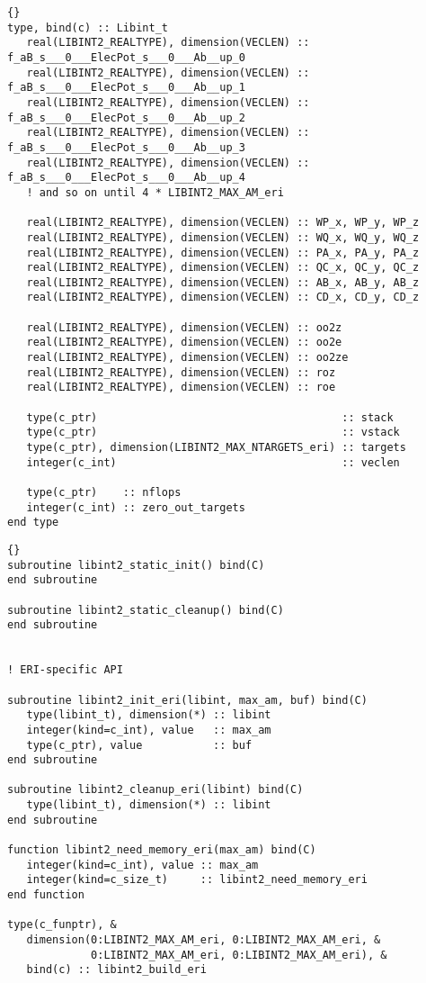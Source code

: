 \documentclass[10pt]{article}
\begin{document}
\begin{lstlisting}[label=lst:libinttf,caption=Fortran definition of the \LIBINT\ integral evaluator type.]{}
type, bind(c) :: Libint_t
   real(LIBINT2_REALTYPE), dimension(VECLEN) :: f_aB_s___0___ElecPot_s___0___Ab__up_0
   real(LIBINT2_REALTYPE), dimension(VECLEN) :: f_aB_s___0___ElecPot_s___0___Ab__up_1
   real(LIBINT2_REALTYPE), dimension(VECLEN) :: f_aB_s___0___ElecPot_s___0___Ab__up_2
   real(LIBINT2_REALTYPE), dimension(VECLEN) :: f_aB_s___0___ElecPot_s___0___Ab__up_3
   real(LIBINT2_REALTYPE), dimension(VECLEN) :: f_aB_s___0___ElecPot_s___0___Ab__up_4
   ! and so on until 4 * LIBINT2_MAX_AM_eri

   real(LIBINT2_REALTYPE), dimension(VECLEN) :: WP_x, WP_y, WP_z
   real(LIBINT2_REALTYPE), dimension(VECLEN) :: WQ_x, WQ_y, WQ_z
   real(LIBINT2_REALTYPE), dimension(VECLEN) :: PA_x, PA_y, PA_z
   real(LIBINT2_REALTYPE), dimension(VECLEN) :: QC_x, QC_y, QC_z
   real(LIBINT2_REALTYPE), dimension(VECLEN) :: AB_x, AB_y, AB_z
   real(LIBINT2_REALTYPE), dimension(VECLEN) :: CD_x, CD_y, CD_z

   real(LIBINT2_REALTYPE), dimension(VECLEN) :: oo2z
   real(LIBINT2_REALTYPE), dimension(VECLEN) :: oo2e
   real(LIBINT2_REALTYPE), dimension(VECLEN) :: oo2ze
   real(LIBINT2_REALTYPE), dimension(VECLEN) :: roz
   real(LIBINT2_REALTYPE), dimension(VECLEN) :: roe

   type(c_ptr)                                      :: stack
   type(c_ptr)                                      :: vstack
   type(c_ptr), dimension(LIBINT2_MAX_NTARGETS_eri) :: targets
   integer(c_int)                                   :: veclen

   type(c_ptr)    :: nflops
   integer(c_int) :: zero_out_targets
end type
\end{lstlisting}

\begin{lstlisting}[label=lst:apif,caption=\LIBINT\ Fortran API procedures and data.]{}
subroutine libint2_static_init() bind(C)
end subroutine

subroutine libint2_static_cleanup() bind(C)
end subroutine


! ERI-specific API

subroutine libint2_init_eri(libint, max_am, buf) bind(C)
   type(libint_t), dimension(*) :: libint
   integer(kind=c_int), value   :: max_am
   type(c_ptr), value           :: buf
end subroutine

subroutine libint2_cleanup_eri(libint) bind(C)
   type(libint_t), dimension(*) :: libint
end subroutine

function libint2_need_memory_eri(max_am) bind(C)
   integer(kind=c_int), value :: max_am
   integer(kind=c_size_t)     :: libint2_need_memory_eri
end function

type(c_funptr), &
   dimension(0:LIBINT2_MAX_AM_eri, 0:LIBINT2_MAX_AM_eri, &
             0:LIBINT2_MAX_AM_eri, 0:LIBINT2_MAX_AM_eri), &
   bind(c) :: libint2_build_eri
\end{lstlisting}
\end{document}
